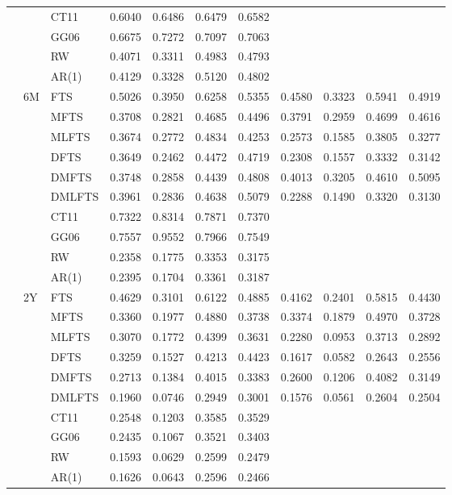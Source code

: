 \documentclass[12pt,a4paper]{article}
\begin{document}
\begin{center}
\begin{small}
\begin{longtable}{@{}lllcccccccc@{}}
  & & CT11 & 0.6040 & 0.6486 & 0.6479 & 0.6582 \\
  & & GG06 & 0.6675 & 0.7272 & 0.7097 & 0.7063 \\
  & & RW & 0.4071 & 0.3311 & 0.4983 & 0.4793 \\
  & & AR(1) & 0.4129 & 0.3328 & 0.5120 & 0.4802 \\
  \cmidrule{2-11}
   &  6M & FTS & 0.5026 & 0.3950 & 0.6258 & 0.5355 & 0.4580 & 0.3323 & 0.5941 & 0.4919 \\ 
  & & MFTS & 0.3708 & 0.2821 & 0.4685 & 0.4496 & 0.3791 & 0.2959 & 0.4699 & 0.4616 \\ 
  & & MLFTS & 0.3674 & 0.2772 & 0.4834 & 0.4253 & 0.2573 & 0.1585 & 0.3805 & 0.3277 \\
   & & DFTS & 0.3649 & 0.2462 & 0.4472 & 0.4719 & 0.2308 & 0.1557 & 0.3332 & 0.3142 \\ 
  & & DMFTS & 0.3748 & 0.2858 & 0.4439 & 0.4808 & 0.4013 & 0.3205 & 0.4610 & 0.5095 \\ 
  & & DMLFTS & 0.3961 & 0.2836 & 0.4638 & 0.5079 & 0.2288 & 0.1490 & 0.3320 & 0.3130 \\
  & & CT11 & 0.7322 & 0.8314 & 0.7871 & 0.7370 \\
  & & GG06 & 0.7557 & 0.9552 & 0.7966 & 0.7549 \\
  & & RW   & 0.2358 & 0.1775 & 0.3353 & 0.3175 \\
  & & AR(1) & 0.2395 & 0.1704 & 0.3361 & 0.3187 \\
  \cmidrule{2-11}
   & 2Y & FTS & 0.4629 & 0.3101 & 0.6122 & 0.4885 & 0.4162 & 0.2401 & 0.5815 & 0.4430 \\ 
  & & MFTS & 0.3360 & 0.1977 & 0.4880 & 0.3738 & 0.3374 & 0.1879 & 0.4970 & 0.3728 \\ 
  & & MLFTS & 0.3070 & 0.1772 & 0.4399 & 0.3631 & 0.2280 & 0.0953 & 0.3713 & 0.2892 \\
   & & DFTS & 0.3259 & 0.1527 & 0.4213 & 0.4423 & 0.1617 & 0.0582 & 0.2643 & 0.2556 \\ 
  & & DMFTS & 0.2713 & 0.1384 & 0.4015 & 0.3383 & 0.2600 & 0.1206 & 0.4082 & 0.3149 \\ 
  & & DMLFTS & 0.1960 & 0.0746 & 0.2949 & 0.3001 & 0.1576 & 0.0561 & 0.2604 & 0.2504 \\
  & & CT11 & 0.2548 & 0.1203 & 0.3585 & 0.3529 \\
  & & GG06 & 0.2435 & 0.1067 & 0.3521 & 0.3403 \\
  & & RW & 0.1593 & 0.0629 & 0.2599 & 0.2479 \\
  & & AR(1) & 0.1626 & 0.0643 & 0.2596 & 0.2466 \\

\end{longtable}
\end{small}
\end{center}
\end{document}
